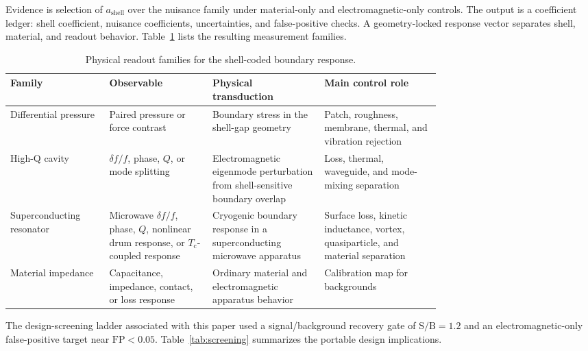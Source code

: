 \documentclass[11pt]{article}
\newcommand{\sbr}{\mathrm{S/B}}
\newcommand{\fp}{\mathrm{FP}}
\newcommand{\Tc}{T_{\mathrm{c}}}
\newcommand{\df}{\delta f/f}
\begin{document}
Evidence is selection of \(a_{\mathrm{shell}}\) over the nuisance family under
material-only and electromagnetic-only controls. The output is a coefficient
ledger: shell coefficient, nuisance coefficients, uncertainties, and
false-positive checks. A geometry-locked response vector separates shell,
material, and readout behavior. Table~\ref{tab:families} lists the resulting
measurement families.

\begin{table}[htbp]
\centering
\caption{Physical readout families for the shell-coded boundary response.}
\label{tab:families}
\small
\begin{tabularx}{\linewidth}{>{\raggedright\arraybackslash}p{0.23\linewidth}
>{\raggedright\arraybackslash}p{0.24\linewidth}
>{\raggedright\arraybackslash}p{0.26\linewidth}
>{\raggedright\arraybackslash}X}
\toprule
Family & Observable & Physical transduction & Main control role \\
\midrule
Differential pressure & Paired pressure or force contrast & Boundary stress in the shell-gap geometry & Patch, roughness, membrane, thermal, and vibration rejection \\
High-Q cavity & \(\df\), phase, \(Q\), or mode splitting & Electromagnetic eigenmode perturbation from shell-sensitive boundary overlap & Loss, thermal, waveguide, and mode-mixing separation \\
Superconducting resonator & Microwave \(\df\), phase, \(Q\), nonlinear drum response, or \(\Tc\)-coupled response & Cryogenic boundary response in a superconducting microwave apparatus & Surface loss, kinetic inductance, vortex, quasiparticle, and material separation \\
Material impedance & Capacitance, impedance, contact, or loss response & Ordinary material and electromagnetic apparatus behavior & Calibration map for backgrounds \\
\bottomrule
\end{tabularx}
\end{table}

The design-screening ladder associated with this paper used a signal/background
recovery gate of \(\sbr=1.2\) and an electromagnetic-only false-positive target near
\(\fp<0.05\). Table~\ref{tab:screening} summarizes the portable design
implications.
\end{document}
